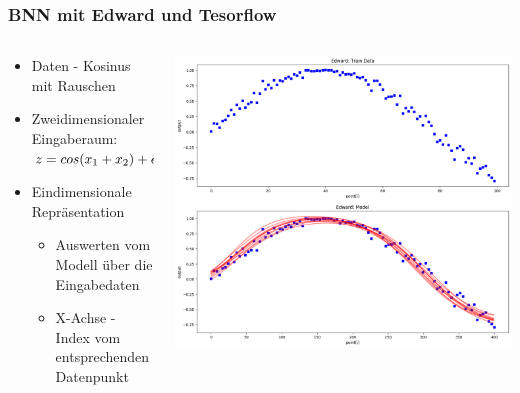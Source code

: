\documentclass[18pt]{beamer}
\begin{document}
\begin{frame}
  \frametitle{BNN mit Edward und Tesorflow}
  \begin{columns}
    \begin{column}{0.4\textwidth}
      \begin{itemize}
      \item Daten - Kosinus mit Rauschen
      \item Zweidimensionaler Eingaberaum: $z = cos(x_1 + x_2) + \epsilon, \newline \epsilon\sim N(0, 0.5)$
      \item Eindimensionale Repräsentation 
        \begin{itemize}
        \item Auswerten vom Modell über die Eingabedaten
        \item X-Achse - Index vom entsprechenden Datenpunkt
        \end{itemize} 
      \end{itemize}
    \end{column}
    \begin{column}{0.6\textwidth}
      \includegraphics[scale=0.2]{images/edward_example_bnn}
    \end{column}
  \end{columns}
  
\end{frame}
\end{document}
